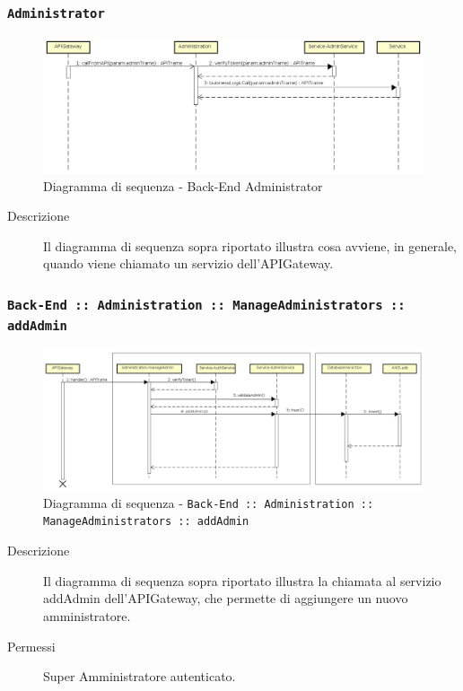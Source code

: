 \documentclass[../DefinizioneDiProdotto_v3.0.0.tex]{subfiles}
\begin{document}
\subsubsection{\texttt{Administrator}}
\begin{figure}[!h]
	\centering
	\includegraphics[width=\textwidth]{DiagrammiSequenza/Back-End/DiagrammaSequenzaBackendAdmin.png}
	\caption{Diagramma di sequenza - Back-End Administrator }
\end{figure}
\begin{description}
	\item [Descrizione] Il diagramma di sequenza sopra riportato illustra cosa avviene, in generale, quando viene chiamato un servizio dell'APIGateway.
\end{description}

\subsubsection{\texttt{Back-End :: Administration :: ManageAdministrators :: addAdmin}}
\begin{figure}[!h]
	\centering
	\includegraphics[width=\textwidth]{DiagrammiSequenza/Back-End/manageAdministrators/addAdmin.png}
	\caption{Diagramma di sequenza - \texttt{Back-End :: Administration :: ManageAdministrators :: addAdmin} }
\end{figure}
\begin{description}
	\item [Descrizione] Il diagramma di sequenza sopra riportato  illustra la chiamata al servizio addAdmin dell'APIGateway, che permette di aggiungere un nuovo amministratore.
	\item [Permessi] Super Amministratore autenticato.
\end{description}
\end{document}
